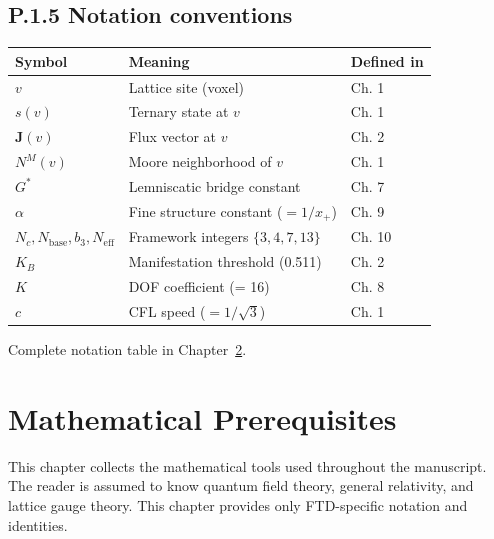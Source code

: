\documentclass[
  11pt,
  letterpaper,
  twoside,
  openright]{book}
\begin{document}
\section{P.1.5 Notation conventions}\label{p.1.5-notation-conventions}

\begin{longtable}[]{@{}
  >{\raggedright\arraybackslash}p{}
  >{\raggedright\arraybackslash}p{}
  >{\raggedright\arraybackslash}p{}@{}}
\toprule\noalign{}
\begin{minipage}[b]{\linewidth}\raggedright
Symbol
\end{minipage} & \begin{minipage}[b]{\linewidth}\raggedright
Meaning
\end{minipage} & \begin{minipage}[b]{\linewidth}\raggedright
Defined in
\end{minipage} \\
\midrule\noalign{}
\endhead
\bottomrule\noalign{}
\endlastfoot
\(v\) & Lattice site (voxel) & Ch. 1 \\
\(s(v)\) & Ternary state at \(v\) & Ch. 1 \\
\(\mathbf{J}(v)\) & Flux vector at \(v\) & Ch. 2 \\
\(N^M(v)\) & Moore neighborhood of \(v\) & Ch. 1 \\
\(G^*\) & Lemniscatic bridge constant & Ch. 7 \\
\(\alpha\) & Fine structure constant (\(= 1/x_+\)) & Ch. 9 \\
\(N_c, N_{\text{base}}, b_3, N_{\text{eff}}\) & Framework integers
\(\{3, 4, 7, 13\}\) & Ch. 10 \\
\(K_B\) & Manifestation threshold (0.511) & Ch. 2 \\
\(K\) & DOF coefficient (= 16) & Ch. 8 \\
\(c\) & CFL speed (\(= 1/\sqrt{3}\)) & Ch. 1 \\
\end{longtable}

Complete notation table in Chapter~\ref{sec-prerequisites}.

\chapter{Mathematical Prerequisites}\label{sec-prerequisites}

This chapter collects the mathematical tools used throughout the
manuscript. The reader is assumed to know quantum field theory, general
relativity, and lattice gauge theory. This chapter provides only
FTD-specific notation and identities.
\end{document}
